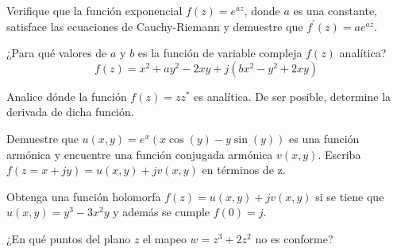 \begin{ejercicio}
    Verifique que la función exponencial $f(z)=e^{az}$, donde $a$ es una constante, satisface las ecuaciones de Cauchy-Riemann y demuestre que $f^{'}(z)=ae^{az}$.
\end{ejercicio}

\begin{ejercicio}
    ¿Para qué valores de $a$ y $b$ es la función de variable compleja $f(z)$ analítica?
    $$ f(z)=x^2+ay^2-2xy + j(bx^2-y^2+2xy) $$
\end{ejercicio}

\begin{ejercicio}
    Analice dónde la función $f(z)=zz^*$ es analítica. De ser posible, determine la derivada de dicha función.
\end{ejercicio}

\begin{ejercicio}
    Demuestre que $u(x,y)=e^x(x \cos(y)-y \sin(y))$ es una función armónica y encuentre una función conjugada armónica $v(x,y)$. Escriba $f(z=x+jy) = u(x,y)+jv(x,y)$ en términos de z.
\end{ejercicio}

\begin{ejercicio}
    Obtenga una función holomorfa $f(z) = u(x,y) + jv(x,y)$ si se tiene que $u(x,y)=y^3-3x^2y$ y además se cumple $f(0)=j$.
\end{ejercicio}

\begin{ejercicio}
    ¿En qué puntos del plano $z$ el mapeo $w=z^3+2z^2$ no es conforme?
\end{ejercicio}
